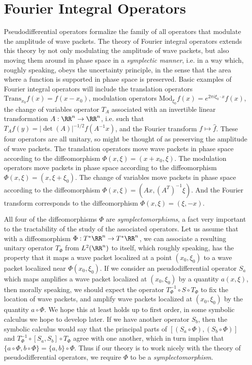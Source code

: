 \chapter{Fourier Integral Operators}

Pseudodifferential operators formalize the family of all operators that modulate the amplitude of wave packets. The theory of Fourier integral operators extends this theory by not only modulating the amplitude of wave packets, but also moving them around in phase space in a \emph{symplectic manner}, i.e. in a way which, roughly speaking, obeys the uncertainty principle, in the sense that the area where a function is supported in phase space is preserved. Basic examples of Fourier integral operators will include the translation operators $\text{Trans}_{x_0} f(x) = f(x - x_0)$, modulation operators $\text{Mod}_{\xi_0} f(x) = e^{2 \pi i \xi_0 \cdot x} f(x)$, the change of variables operator $T_A$ associated with an invertible linear transformation $A: \RR^n \to \RR^n$, i.e. such that $T_A f(y) =  |\det(A)|^{-1/2} f(A^{-1} x)$, and the Fourier transform $f \mapsto \widehat{f}$. These four operators are all unitary, so might be thought of as preserving the amplitude of wave packets. The translation operators move wave packets in phase space according to the diffeomorphism $\Phi(x,\xi) = (x + x_0, \xi)$. The modulation operators move packets in phase space according to the diffeomorphism $\Phi(x,\xi) = (x,\xi + \xi_0)$. The change of variables move packets in phase space according to the diffeomorphism $\Phi(x,\xi) = (Ax, (A^T)^{-1} \xi)$. And the Fourier transform corresponds to the diffeomorphism $\Phi(x,\xi) = (\xi,-x)$.

All four of the diffeomorphisms $\Phi$ are \emph{symplectomorphisms}, a fact very important to the tractability of the study of the associated operators. Let us assume that with a diffeomorphism $\Phi: T^* \RR^n \to T^* \RR^n$, we can associate a resulting unitary operator $T_\Phi$ from $L^2(\RR^n)$ to itself, which roughly speaking, has the property that it maps a wave packet localized at a point $(x_0,\xi_0)$ to a wave packet localized near $\Phi(x_0,\xi_0)$. If we consider an pseudodifferential operator $S_a$ which maps amplifies a wave packet localized at $(x_0,\xi_0)$ by a quantity $a(x,\xi)$, then morally speaking, we should expect the operator $T_\Phi^{-1} \circ S \circ T_\Phi$ to fix the location of wave packets, and amplify wave packets localized at $(x_0,\xi_0)$ by the quantity $a \circ \Phi$. We hope this at least holds up to first order, in some symbolic calculus we hope to develop later. If we have another operator $S_b$, then the symbolic calculus would say that the principal parts of  $[(S_a \circ \Phi), (S_b \circ \Phi)]$ and $T_\Phi^{-1} \circ [S_a, S_b] \circ T_\Phi$ agree with one another, which in turn implies that $\{ a \circ \Phi, b \circ \Phi \} = \{ a, b \} \circ \Phi$. Thus if our theory is to work nicely with the theory of pseudodifferential operators, we require $\Phi$ to be a \emph{symplectomorphism}.

